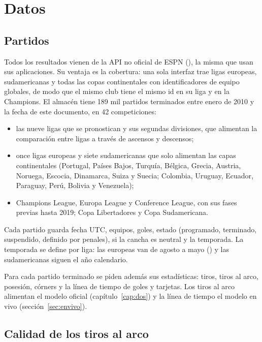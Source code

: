 \chapter{Datos}
\label{cap:datos}

\section{Partidos}

Todos los resultados vienen de la API no oficial de ESPN (), la misma que usan sus aplicaciones. Su ventaja es la cobertura: una sola interfaz trae ligas europeas, sudamericanas y todas las copas continentales con identificadores de equipo globales, de modo que el mismo club tiene el mismo id en su liga y en la Champions. El almacén tiene 189 mil partidos terminados entre enero de 2010 y la fecha de este documento, en 42 competiciones:

\begin{itemize}
\item las nueve ligas que se pronostican y sus segundas divisiones, que alimentan la comparación entre ligas a través de ascensos y descensos;
\item once ligas europeas y siete sudamericanas que solo alimentan las capas continentales (Portugal, Países Bajos, Turquía, Bélgica, Grecia, Austria, Noruega, Escocia, Dinamarca, Suiza y Suecia; Colombia, Uruguay, Ecuador, Paraguay, Perú, Bolivia y Venezuela);
\item Champions League, Europa League y Conference League, con sus fases previas hasta 2019; Copa Libertadores y Copa Sudamericana.
\end{itemize}

Cada partido guarda fecha UTC, equipos, goles, estado (programado, terminado, suspendido, definido por penales), si la cancha es neutral y la temporada. La temporada se define por liga: las europeas van de agosto a mayo () y las sudamericanas siguen el año calendario.

Para cada partido terminado se piden además sus estadísticas: tiros, tiros al arco, posesión, córners y la línea de tiempo de goles y tarjetas. Los tiros al arco alimentan el modelo oficial (capítulo~\ref{cap:dos}) y la línea de tiempo el modelo en vivo (sección~\ref{sec:envivo}).

\section{Calidad de los tiros al arco}
\label{sec:sot}

